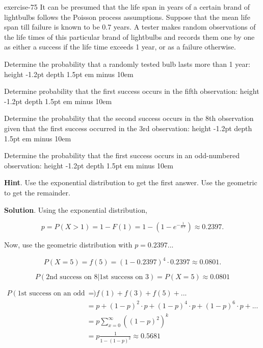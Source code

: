 \documentclass[10pt,]{book}
\newcommand{\fillin}[1]{\leavevmode\leaders\vrule height -1.2pt depth 1.5pt \hskip #1em minus #1em \null}
\numberwithin{equation}{section}
\newcommand{\gt}{>}
\newcommand{\amp}{&}
\begin{document}
\begin{inlineexercise}{}{exercise-75}%
\hypertarget{p-1115}{}%
It can be presumed that the life span in years of a certain brand of lightbulbs follows the Poisson process assumptions.  Suppose that the mean life span till failure is known to be 0.7 years. A tester makes random observations of the life times of this particular brand of lightbulbs and records them one by one as either a success if the life time exceeds 1 year, or as a failure otherwise.%
\par
\hypertarget{p-1116}{}%
Determine the probability that a randomly tested bulb lasts more than 1 year:  \fillin{10}%
\par
\hypertarget{p-1117}{}%
Determine probability that the first success occurs in the fifth observation:  \fillin{10}%
\par
\hypertarget{p-1118}{}%
Determine the probability that the second success occurs in the 8th observation given that the first success occurred in the 3rd observation:   \fillin{10}%
\par
\hypertarget{p-1119}{}%
Determine the probability that the first success occurs in an odd-numbered observation:  \fillin{10}%
\par\smallskip%
\noindent\textbf{Hint}.\hypertarget{hint-8}{}\quad%
\hypertarget{p-1120}{}%
Use the exponential distribution to get the first answer. Use the geometric to get the remainder.%
\par\smallskip%
\noindent\textbf{Solution}.\hypertarget{solution-36}{}\quad%
\hypertarget{p-1121}{}%
Using the exponential distribution,%
\par
\hypertarget{p-1122}{}%
%
\begin{equation*}
p = P(X \gt 1) = 1 - F(1) = 1 - (1-e^{-\frac{1}{0.7}}) \approx 0.2397.
\end{equation*}
%
\par
\hypertarget{p-1123}{}%
Now, use the geometric distribution with \(p = 0.2397\text{...}\)%
\par
\hypertarget{p-1124}{}%
%
\begin{equation*}
P(X = 5) = f(5) = (1-0.2397)^4 \cdot 0.2397 \approx 0.0801.
\end{equation*}
%
\par
\hypertarget{p-1125}{}%
%
\begin{equation*}
P(\text{2nd success on 8} | \text{1st success on 3}) = P(X = 5) \approx 0.0801
\end{equation*}
%
\par
\hypertarget{p-1126}{}%
%
\begin{equation*}
\begin{aligned}
P(\text{1st success on an odd trial}) \amp  = f(1) + f(3) + f(5) + ...\\
\amp  = p + (1-p)^2 \cdot p + (1-p)^4 \cdot p + (1-p)^6 \cdot p + ... \\
\amp  = p \sum_{x=0}^{\infty} \left ( (1-p)^2 \right)^k \\
\amp  = p \frac{1}{1-(1-p)^2} \approx 0.5681
\end{aligned}
\end{equation*}
%
\end{inlineexercise}
\end{document}
